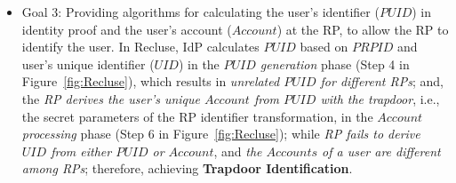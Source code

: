 \begin{itemize}
  \item Goal 3: Providing algorithms for calculating the user's identifier ($PUID$) in identity proof and the user's account ($Account$) at the RP,
   to allow the RP to identify the user.
  In Recluse, IdP calculates $PUID$ based on $PRPID$ and user's unique identifier ($UID$) in the \emph{$PUID$ generation} phase (Step 4 in Figure~\ref{fig:Recluse}), which results in \emph{unrelated $PUID$  for different RPs};
  and,  the \emph{RP derives the user's unique $Account$  from $PUID$ with the  trapdoor}, i.e., the secret parameters of the RP identifier transformation,   in the \emph{$Account$ processing} phase (Step 6 in Figure~\ref{fig:Recluse}); while  \emph{RP fails to derive $UID$ from either $PUID$ or $Account$}, and \emph{the $Accounts$ of a user are different among RPs};
   therefore, achieving \textbf{Trapdoor Identification}.




\end{itemize}


